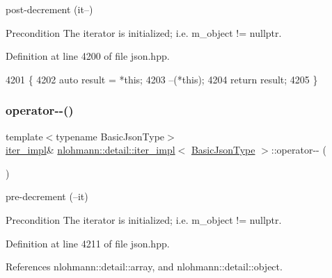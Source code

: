 post-\/decrement (it--) 

\begin{DoxyPrecond}{Precondition}
The iterator is initialized; i.\+e. {\ttfamily m\+\_\+object != nullptr}. 
\end{DoxyPrecond}


Definition at line 4200 of file json.\+hpp.


\begin{DoxyCode}
4201     \{
4202         \textcolor{keyword}{auto} result = *\textcolor{keyword}{this};
4203         --(*this);
4204         \textcolor{keywordflow}{return} result;
4205     \}
\end{DoxyCode}
\mbox{\label{classnlohmann_1_1detail_1_1iter__impl_a84e689fb581d651d130039f7cb81494a}} 
\subsubsection{\texorpdfstring{operator-\/-\/()}{operator--()}\hspace{0.1cm}{\footnotesize\ttfamily [2/2]}}
{\footnotesize\ttfamily template$<$typename Basic\+Json\+Type$>$ \\
\hyperlink{classnlohmann_1_1detail_1_1iter__impl}{iter\+\_\+impl}\& \hyperlink{classnlohmann_1_1detail_1_1iter__impl}{nlohmann\+::detail\+::iter\+\_\+impl}$<$ \hyperlink{classnlohmann_1_1detail_1_1iter__impl_abf18f18793f84b0222aebb5a2a87da7a}{Basic\+Json\+Type} $>$\+::operator-\/-\/ (\begin{DoxyParamCaption}{ }\end{DoxyParamCaption})\hspace{0.3cm}{\ttfamily [inline]}}



pre-\/decrement (--it) 

\begin{DoxyPrecond}{Precondition}
The iterator is initialized; i.\+e. {\ttfamily m\+\_\+object != nullptr}. 
\end{DoxyPrecond}


Definition at line 4211 of file json.\+hpp.



References nlohmann\+::detail\+::array, and nlohmann\+::detail\+::object.


